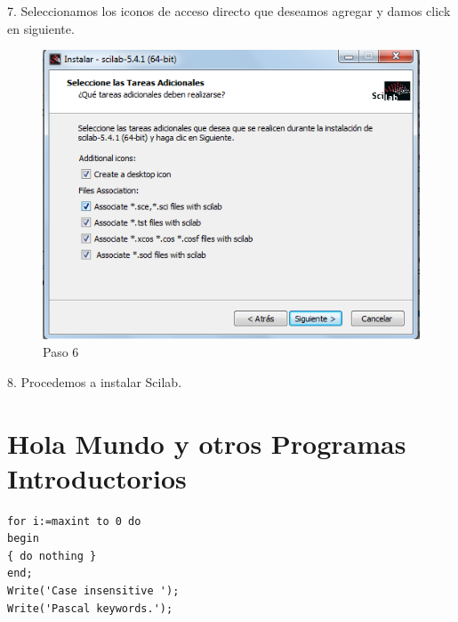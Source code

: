 \documentclass[11pt]{article} %
\begin{document}
7.	Seleccionamos los iconos de acceso directo que deseamos agregar y damos click en siguiente.

\begin{figure}
  \centering
    \includegraphics{Captura6}
  \caption{Paso 6}
  \label{fig:paso6}
\end{figure}

8.	Procedemos a instalar Scilab.

\section{Hola Mundo y otros Programas Introductorios}

\lstset{language=Pascal}          %

\begin{lstlisting}[frame=single]  % Start your code-block
for i:=maxint to 0 do
begin
{ do nothing }
end;
Write('Case insensitive ');
Write('Pascal keywords.');
\end{lstlisting}
\end{document}
